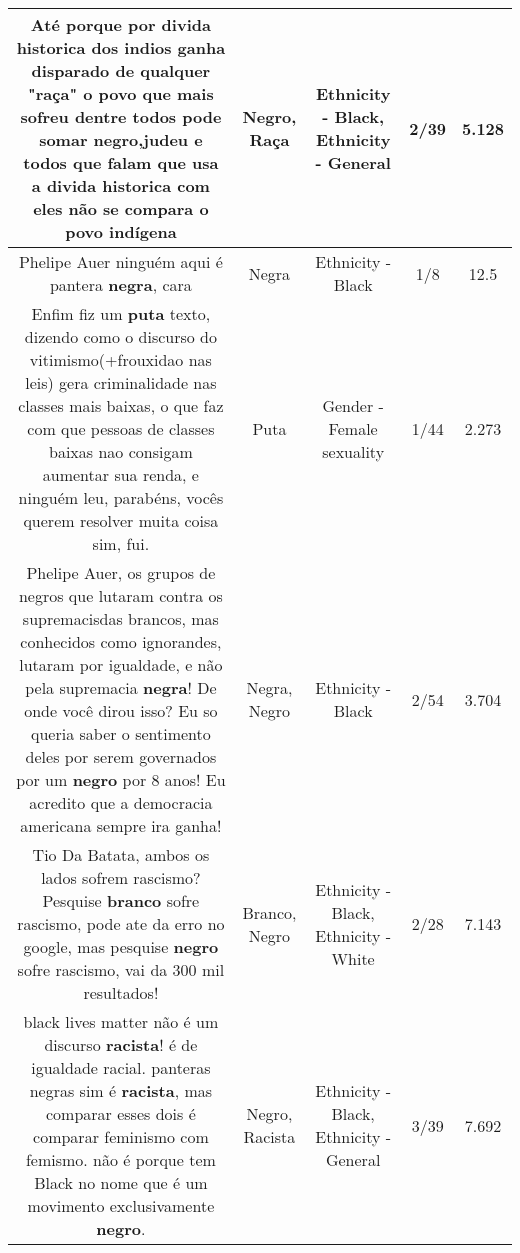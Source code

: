\documentclass[11pt]{article}
\newlength\mylength
\begin{document}
\begin{center}
\begin{longtable}{|C{.65\mylength}|C{.30\mylength}|C{.12\mylength}|C{.12\mylength}|C{.12\mylength}|}
  \small Até porque por divida historica dos indios ganha disparado de qualquer "\textbf{raça}" o povo que mais sofreu dentre todos pode somar \textbf{negro},judeu e todos que falam que usa a divida historica com eles não se compara o povo indígena\normalsize   & Negro, Raça & Ethnicity - Black, Ethnicity - General & 2/39 & 5.128 \\  \hline
  \small Phelipe Auer ninguém aqui é pantera \textbf{negra}, cara\normalsize   & Negra & Ethnicity - Black & 1/8 & 12.5 \\  \hline
  \small Enfim fiz um \textbf{puta} texto, dizendo como o discurso do vitimismo(+frouxidao nas leis) gera criminalidade nas classes mais baixas, o que faz com que pessoas de classes baixas nao consigam aumentar sua renda, e ninguém leu, parabéns, vocês querem resolver muita coisa sim, fui.\normalsize   & Puta & Gender - Female sexuality & 1/44 & 2.273 \\  \hline
  \small Phelipe Auer, os grupos de negros que lutaram contra os supremacisdas brancos, mas conhecidos como ignorandes, lutaram por igualdade, e não pela supremacia \textbf{negra}! De onde você dirou isso? Eu so queria saber o sentimento deles por serem governados por um \textbf{negro} por 8 anos! Eu acredito que a democracia americana sempre ira ganha!\normalsize   & Negra, Negro & Ethnicity - Black & 2/54 & 3.704 \\  \hline
  \small Tio Da Batata, ambos os lados sofrem rascismo? Pesquise \textbf{branco} sofre rascismo, pode ate da erro no google, mas pesquise \textbf{negro} sofre rascismo, vai da 300 mil resultados!\normalsize   & Branco, Negro & Ethnicity - Black, Ethnicity - White & 2/28 & 7.143 \\  \hline
  \small black lives matter não é um discurso \textbf{racista}! é de igualdade racial. panteras negras sim é \textbf{racista}, mas comparar esses dois é comparar feminismo com femismo. não é porque tem Black no nome que é um movimento exclusivamente \textbf{negro}.\normalsize   & Negro, Racista & Ethnicity - Black, Ethnicity - General & 3/39 & 7.692 \\  \hline

\end{longtable}
\end{center}
\end{document}
